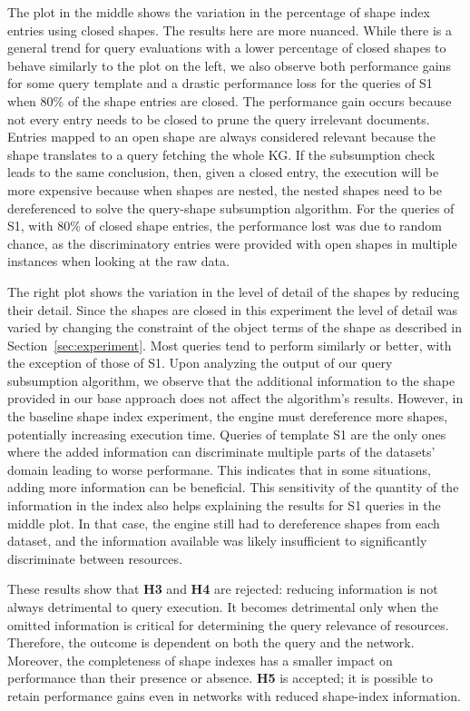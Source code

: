 The plot in the middle shows the variation in the percentage of shape index entries using closed shapes.
The results here are more nuanced.
While there is a general trend for query evaluations with a lower percentage of closed shapes to behave similarly to the plot on the left, we also observe both performance gains for some query template and a drastic performance loss for the queries of S1 when 80\% of the shape entries are closed.
The performance gain occurs because not every entry needs to be closed to prune the query irrelevant documents.
Entries mapped to an open shape are always considered relevant because the shape translates to a query fetching the whole KG.
If the subsumption check leads to the same conclusion, then, given a closed entry, the execution will be more expensive because 
when shapes are nested, the nested shapes need to be dereferenced to solve the query-shape subsumption algorithm.
For the queries of S1, with 80\% of closed shape entries, the performance lost was due to random chance, as the discriminatory entries were provided with open shapes in multiple instances when looking at the raw data.

The right plot shows the variation in the level of detail of the shapes by reducing their detail.
Since the shapes are closed in this experiment the level of detail was varied by changing the constraint of the object terms of the shape as described in Section~\ref{sec:experiment}.
Most queries tend to perform similarly or better, with the exception of those of S1.
Upon analyzing the output of our query subsumption algorithm, we observe that the additional information to the shape provided in our base approach does not affect the algorithm's results.
However, in the baseline shape index experiment, the engine must dereference more shapes, potentially increasing execution time.
Queries of template S1 are the only ones where the added information can discriminate multiple parts of the datasets' domain leading to worse performane.
This indicates that in some situations, adding more information can be beneficial.
This sensitivity of the quantity of the information in the index also helps explaining the results for S1 queries in the middle plot. 
In that case, the engine still had to dereference shapes from each dataset, and the information available was likely insufficient to significantly discriminate between resources.

These results show that \textbf{H3} and \textbf{H4} are rejected: reducing information is not always detrimental to query execution.
It becomes detrimental only when the omitted information is critical for determining the query relevance of resources. 
Therefore, the outcome is dependent on both the query and the network. 
Moreover, the completeness of shape indexes has a smaller impact on performance than their presence or absence.
\textbf{H5} is accepted; it is possible to retain performance gains even in networks with reduced shape-index information.

